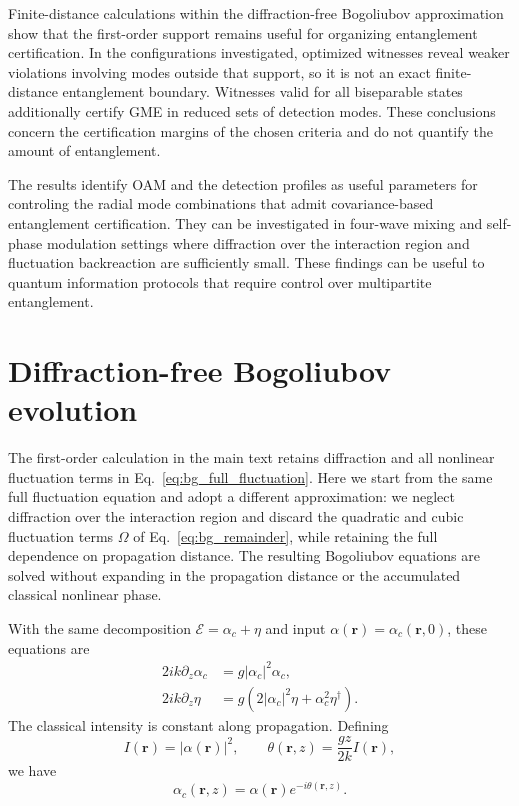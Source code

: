 \documentclass[%
 reprint,
 amsmath,amssymb,
 aps,
pra,
twocolumn,
]{revtex4-2}
\begin{document}
Finite-distance calculations within the diffraction-free Bogoliubov approximation show that the first-order support remains useful for organizing entanglement certification. In the configurations investigated, optimized witnesses reveal weaker violations involving modes outside that support, so it is not an exact finite-distance entanglement boundary. Witnesses valid for all biseparable states additionally certify GME in reduced sets of detection modes. These conclusions concern the certification margins of the chosen criteria and do not quantify the amount of entanglement.

The results identify OAM and the detection profiles as useful parameters for controling the radial mode combinations that admit covariance-based entanglement certification. They can be investigated in four-wave mixing and self-phase modulation settings where diffraction over the interaction region and fluctuation backreaction are sufficiently small. These findings can be useful to quantum information protocols that require control over multipartite entanglement.

\appendix

\section{Diffraction-free Bogoliubov evolution}
\label{app:no_diffraction}

The first-order calculation in the main text retains diffraction and all nonlinear fluctuation terms in Eq.~\eqref{eq:bg_full_fluctuation}. Here we start from the same full fluctuation equation and adopt a different approximation: we neglect diffraction over the interaction region and discard the quadratic and cubic fluctuation terms $\Omega$ of Eq.~\eqref{eq:bg_remainder}, while retaining the full dependence on propagation distance. The resulting Bogoliubov equations are solved without expanding in the propagation distance or the accumulated classical nonlinear phase.

With the same decomposition $\mathcal E=\alpha_c+\eta$ and input $\alpha(\mathbf r)=\alpha_c(\mathbf r,0)$, these equations are
\begin{equation}
\begin{aligned}
    2ik\partial_z\alpha_c&=g|\alpha_c|^2\alpha_c,\\
    2ik\partial_z\eta&=g\left(2|\alpha_c|^2\eta+\alpha_c^2\eta^\dagger\right).
\end{aligned}
    \label{eq:nodiff_bog_equations}
\end{equation}
The classical intensity is constant along propagation. Defining
\begin{equation}
    I(\mathbf r)=|\alpha(\mathbf r)|^2,
    \qquad \theta(\mathbf r,z)=\frac{gz}{2k}I(\mathbf r),
\end{equation}
we have
\begin{equation}
    \alpha_c(\mathbf r,z)=\alpha(\mathbf r)e^{-i\theta(\mathbf r,z)}.
    \label{eq:nodiff_classical}
\end{equation}
\end{document}
